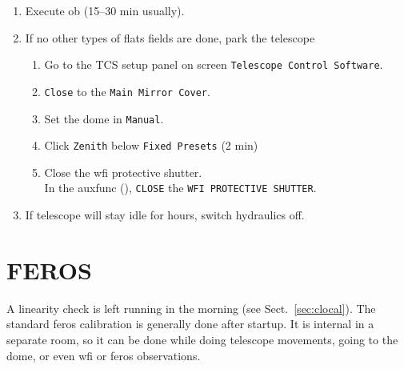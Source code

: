 \documentclass[11pt,fleqn,a4paper]{book}
\makeatletter
\def\menu#1#2{\texttt{#1}\ifx{}#2\else\@for\@x:=#2\do{$\rightarrow$\texttt{\@x}}\fi}
\def\wmenu#1#2{window menu \menu{#1}{#2}}
\makeatother
\begin{document}
\begin{enumerate}
\begin{enumerate}
\begin{enumerate}
                 \item Use \wmenu{Interface}{Engineering}.
                 \item Middle-click the filtre name, fill in value, and type enter.\\
                       Name is \texttt{ESONNN\_name/width} (\texttt{NNN}: number, \texttt{name}: filtre name or wavelength)\\
                       In \gls{desktop} \texttt{WFI ICS}, a filtre list is found below \texttt{SETUP Instrument}
                 \item Deactivate the filtres you don't want.\\
                       Right-click the triangles to get a thumb down
              \end{enumerate}       
     \end{enumerate}
     \item Execute \gls{ob} (15--30 min usually).
     \item If no other types of flats fields are done, park the telescope 
     \begin{enumerate}
         \item Go to the \gls{TCS setup panel} on screen \texttt{Telescope Control Software}.
         \item \texttt{Close} to the \texttt{Main Mirror Cover}.
         \item Set the \gls{dome} in \texttt{Manual}.
         \item Click \texttt{Zenith} below \texttt{Fixed Presets} (2 min)
         \item Close the \gls{wfi} \gls{protective shutter}.\\
           In the \gls{auxfunc} (), \texttt{CLOSE} the \texttt{WFI PROTECTIVE SHUTTER}.
     \end{enumerate}
     \item If telescope will stay idle for hours, switch hydraulics off.
   \end{enumerate}



\section{FEROS}

A linearity check is left running in the morning (see Sect.~\ref{sec:clocal}). The standard \gls{feros} calibration is generally done after startup.  It is internal in a separate room, so it can be done while doing telescope movements, going to the \gls{dome}, or even \gls{wfi} or \gls{feros} observations.
\end{document}
